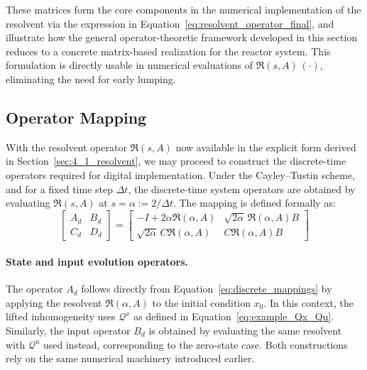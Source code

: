 These matrices form the core components in the numerical implementation of the resolvent via the expression in Equation~\eqref{eq:resolvent_operator_final}, and illustrate how the general operator-theoretic framework developed in this section reduces to a concrete matrix-based realization for the reactor system. This formulation is directly usable in numerical evaluations of $\mathfrak{R}(s, A)\, (\cdot)$, eliminating the need for early lumping.


\subsection{Operator Mapping} \label{sec:4_2_dt_operators}

With the resolvent operator $\mathfrak{R}(s, A)$ now available in the explicit form derived in Section~\ref{sec:4_1_resolvent}, we may proceed to construct the discrete-time operators required for digital implementation. Under the Cayley--Tustin scheme, and for a fixed time step $\Delta t$, the discrete-time system operators are obtained by evaluating $\mathfrak{R}(s, A)$ at $s = \alpha := 2 / \Delta t$. The mapping is defined formally as:
\begin{equation} \label{eq:discrete_mappings}
\begin{bmatrix}
A_d & B_d \\
C_d & D_d
\end{bmatrix}
=
\begin{bmatrix}
-I + 2\alpha \mathfrak{R}(\alpha, A) & \sqrt{2\alpha}\, \mathfrak{R}(\alpha, A) B \\
\sqrt{2\alpha}\, C \mathfrak{R}(\alpha, A) & C \mathfrak{R}(\alpha, A) B
\end{bmatrix}
\end{equation}

\paragraph{State and input evolution operators.}  
The operator $A_d$ follows directly from Equation~\eqref{eq:discrete_mappings} by applying the resolvent $\mathfrak{R}(\alpha, A)$ to the initial condition $x_0$. In this context, the lifted inhomogeneity uses $\mathcal{Q}^x$ as defined in Equation~\eqref{eq:example_Qx_Qu}. Similarly, the input operator $B_d$ is obtained by evaluating the same resolvent with $\mathcal{Q}^u$ used instead, corresponding to the zero-state case. Both constructions rely on the same numerical machinery introduced earlier.

